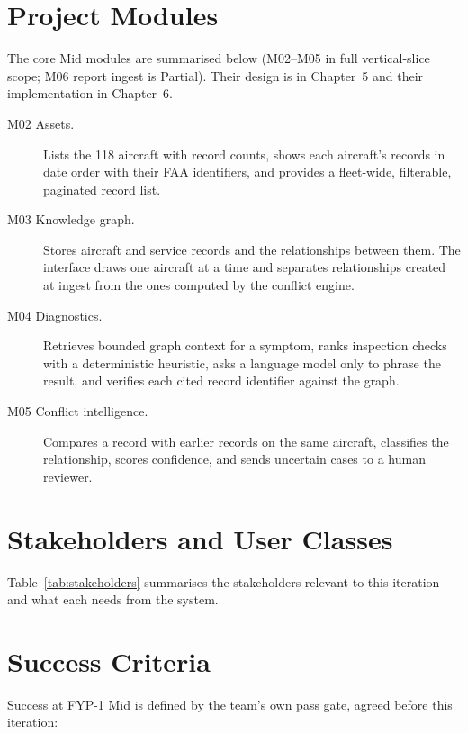

\section{Project Modules}

The core Mid modules are summarised below (M02--M05 in full vertical-slice scope; M06 report ingest is Partial). Their design is in Chapter~5 and their implementation in Chapter~6.

\begin{description}
\item[M02 Assets.] Lists the 118 aircraft with record counts, shows each aircraft's records in date order with their FAA identifiers, and provides a fleet-wide, filterable, paginated record list.
\item[M03 Knowledge graph.] Stores aircraft and service records and the relationships between them. The interface draws one aircraft at a time and separates relationships created at ingest from the ones computed by the conflict engine.
\item[M04 Diagnostics.] Retrieves bounded graph context for a symptom, ranks inspection checks with a deterministic heuristic, asks a language model only to phrase the result, and verifies each cited record identifier against the graph.
\item[M05 Conflict intelligence.] Compares a record with earlier records on the same aircraft, classifies the relationship, scores confidence, and sends uncertain cases to a human reviewer.
\end{description}

\section{Stakeholders and User Classes}

Table~\ref{tab:stakeholders} summarises the stakeholders relevant to this iteration and what each needs from the system.



\section{Success Criteria}

Success at FYP-1 Mid is defined by the team's own pass gate, agreed before this iteration:

